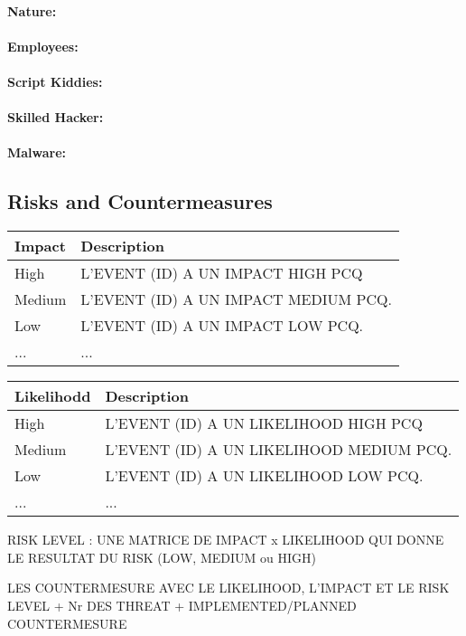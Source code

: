 \documentclass[a4paper,10pt]{article}
\begin{document}
\paragraph{Nature:}
\paragraph{Employees:}
\paragraph{Script Kiddies:}
\paragraph{Skilled Hacker:}
\paragraph{Malware:}

\subsection{Risks and Countermeasures}
\begin{table}[!h]
	\centering
	\begin{tabular}{|p{3cm}|p{10.5cm}|}
		\hline
		\textbf{Impact} & \textbf{Description}                 \\
		\hline
		High  &  L'EVENT (ID) A UN IMPACT HIGH PCQ \\
		\hline
		Medium  &  L'EVENT (ID) A UN IMPACT MEDIUM PCQ.\\
		\hline
		Low & L'EVENT (ID) A UN IMPACT LOW PCQ.\\
		\hline
		... & ...\\
		\hline
	\end{tabular}
\end{table}

\begin{table}[!h]
	\centering
	\begin{tabular}{|p{3cm}|p{10.5cm}|}
		\hline
		\textbf{Likelihodd} & \textbf{Description}                 \\
		\hline
		High  &  L'EVENT (ID) A UN LIKELIHOOD HIGH PCQ \\
		\hline
		Medium  &  L'EVENT (ID) A UN LIKELIHOOD MEDIUM PCQ.\\
		\hline
		Low & L'EVENT (ID) A UN LIKELIHOOD LOW PCQ.\\
		\hline
		... &  ...\\
		\hline
	\end{tabular}
\end{table}

RISK LEVEL : UNE MATRICE DE IMPACT x LIKELIHOOD QUI DONNE LE RESULTAT DU RISK (LOW, MEDIUM ou HIGH)


LES COUNTERMESURE AVEC LE LIKELIHOOD, L'IMPACT ET LE RISK LEVEL + Nr DES THREAT + IMPLEMENTED/PLANNED COUNTERMESURE
\end{document}
